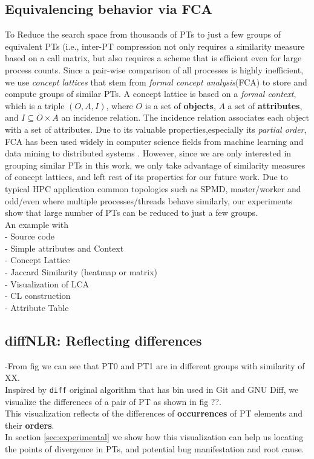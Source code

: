 \subsection{Equivalencing behavior via FCA}
\label{subsec:fca}
To Reduce the search space from thousands of PTs to just a few groups of equivalent PTs (i.e., inter-PT compression not only requires a similarity measure based on a call matrix, but also requires a scheme that is efficient even for large process counts.
%
Since a pair-wise comparison of all processes is highly inefficient, we use \textit{concept lattices} that stem from \textit{formal concept analysis}(FCA)\cite{clbook} to store and compute groups of similar PTs.
%
A concept lattice is based on a \textit{formal context}\cite{clbook}, which is a triple $(O, A, I)$, where $O$ is a set of \textbf{objects}, $A$ a set of \textbf{attributes}, and $I \subseteq O \times A$ an incidence relation. The incidence relation associates each object with a set of attributes.
%
Due to its valuable properties,especially its \textit{partial order}, FCA has been used widely in computer science fields from machine learning and data mining \cite{Ignatov17} to distributed systems \cite{latticeForDistConst}.
%
However, since we are only interested in grouping similar PTs in this work, we only take advantage of similarity measures \cite{Alqadah2011} of concept lattices,
%
and left rest of its properties for our future work.
%
Due to typical HPC application common topologies such as SPMD, master/worker and odd/even where multiple processes/threads behave similarly, our experiments show that large number of PTs can be reduced to just a few groups.
%
\\
An example with 
\\
- Source code
\\
- Simple attributes and Context
\\
- Concept Lattice
\\
- Jaccard Similarity (heatmap or matrix)
\\
- Visualization of LCA
\\
- CL construction \cite{clconst} \cite{bender05}  
\\
- Attribute Table


\subsection{diffNLR: Reflecting differences}
\label{subsec:diffnlr}
-From fig we can see that PT0 and PT1 are in different groups with similarity of XX. 
%
\\
Inspired by \texttt{diff} original algorithm\cite{diff-myers} that has bin used in Git and GNU Diff, we visualize the differences of a pair of PT as shown in fig ??.
\\
This visualization reflects of the differences of \textbf{occurrences} of PT elements and their \textbf{orders}.
\\
In section \ref{sec:experimental} we show how this visualization can help us locating the points of divergence in PTs, and potential bug manifestation and root cause.


